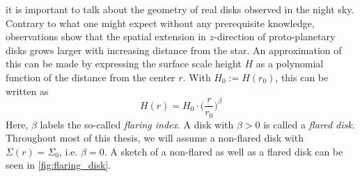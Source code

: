     it is important to talk about the geometry of real disks observed in 
    the night sky. Contrary to what one might expect without any prerequisite 
    knowledge, observations show that the spatial extension in $z$-direction of 
    proto-planetary disks grows larger with increasing distance from the star.
    An approximation of this can be made by expressing the surface scale height
    $H$ as a polynomial function of the distance from the center $r$. With 
    $H_0:=H(r_0)$, this can be written as
    \begin{equation}
      H(r)=H_0\cdot\bigg(\frac{r}{r_0}\bigg)^{\beta}
      \label{eq:def_surface_scale_height_as_a_fct_of_r}
    \end{equation}
    Here, $\beta$ labels the so-called \textit{flaring index}. A disk with 
    $\beta>0$ is called a \textit{flared disk}. Throughout most of this thesis, 
    we will 
    assume a non-flared disk with $\Sigma(r)=\Sigma_0$, i.e. $\beta=0$.
    A sketch of a non-flared as well as a flared disk can be seen in
    \autoref{fig:flaring_disk}.

